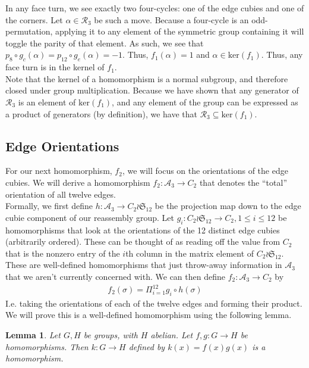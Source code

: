 \documentclass[10pt,letterpaper]{report}
\newtheorem{lemma}{Lemma}
\begin{document}
In any face turn, we see exactly two four-cycles: one of the edge cubies and one of the corners.  Let $\alpha \in \mathcal{R}_3$ be such a move.  Because a four-cycle is an odd-permutation, applying it to any element of the symmetric group containing it will toggle the parity of that element.  As such, we see that $p_{8} \circ g_c (\alpha) = p_{12} \circ g_e (\alpha) = -1$.  Thus, $f_1(\alpha) = 1$ and $\alpha \in \text{ker}(f_1)$.  Thus, any face turn is in the kernel of $f_1$.  \\

Note that the kernel of a homomorphism is a normal subgroup, and therefore closed under group multiplication.  Because we have shown that any generator of $\mathcal{R}_3$ is an element of $\text{ker}(f_1)$, and any element of the group can be expressed as a product of generators (by definition), we have that $\mathcal{R}_3 \subseteq \text{ker}(f_1)$.

\subsection{Edge Orientations}

For our next homomorphism, $f_2$, we will focus on the orientations of the edge cubies.  We will derive a homomorphism $f_2 : \mathcal{A}_3 \rightarrow C_2$ that denotes the ``total'' orientation of all twelve edges.  \\

Formally, we first define $h: \mathcal{A}_3 \rightarrow C_2 \wr \mathfrak{S}_{12}$ be the projection map down to the edge cubie component of our reassembly group.  Let $g_i : C_2 \wr \mathfrak{S}_{12} \rightarrow C_2, 1 \leq i \leq 12$ be homomorphisms that look at the orientations of the 12 distinct edge cubies (arbitrarily ordered).  These can be thought of as reading off the value from $C_2$ that is the nonzero entry of the $i$th column in the matrix element of $C_2 \wr \mathfrak{S}_{12}$.  These are well-defined homomorphisms that just throw-away information in $\mathcal{A}_3$ that we aren't currently concerned with.  We can then define $f_2: \mathcal{A}_3 \rightarrow C_2$ by
\begin{align*}
f_2(\sigma) = \Pi_{i=1}^{12}g_i \circ h (\sigma)
\end{align*}  
I.e. taking the orientations of each of the twelve edges and forming their product.  We will prove this is a well-defined homomorphism using the following lemma.

\begin{lemma}
Let $G,H$ be groups, with $H$ abelian.  Let $f,g:G \rightarrow H$ be homomorphisms.  Then $k: G \rightarrow H$ defined by $k(x) = f(x)g(x)$ is a homomorphism.
\end{lemma}
\end{document}
